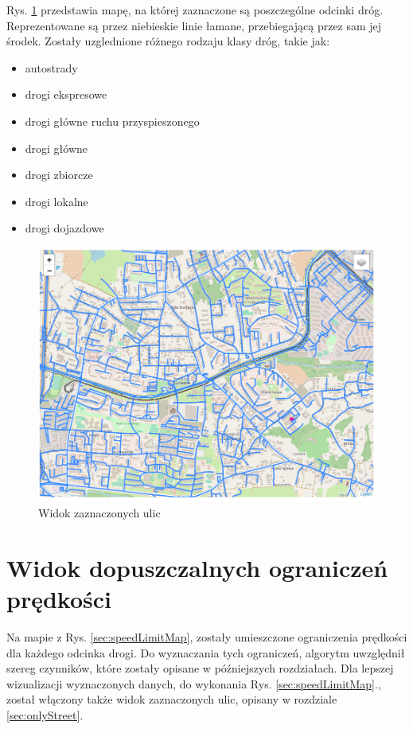 Rys. \ref{sec:onlyStreetMap} przedstawia mapę, na której zaznaczone są poszczególne odcinki dróg. Reprezentowane są przez niebieskie linie łamane, przebiegającą przez sam jej środek. Zostały uzglednione różnego rodzaju klasy dróg, takie jak: 
\begin{itemize}
\item autostrady
\item drogi ekspresowe
\item drogi główne ruchu przyspieszonego
\item drogi główne
\item drogi zbiorcze
\item drogi lokalne
\item drogi dojazdowe
\end{itemize}

\begin{figure}[h]
\caption{Widok zaznaczonych ulic}
\label{sec:onlyStreetMap}
\centering
\includegraphics[width=1.03\textwidth]{onlyStreet}
\end{figure}

\newpage
\section{Widok dopuszczalnych ograniczeń prędkości}
\label{sec:speedLimit}


Na mapie z Rys. \ref{sec:speedLimitMap}, zostały umieszczone ograniczenia prędkości dla każdego odcinka drogi. Do wyznaczania tych ograniczeń, algorytm uwzględnił szereg czynników, które zostały opisane w późniejszych rozdziałach. Dla lepszej wizualizacji wyznaczonych danych, do wykonania Rys. \ref{sec:speedLimitMap}., został włączony także widok zaznaczonych ulic, opisany w rozdziale \ref{sec:onlyStreet}.

